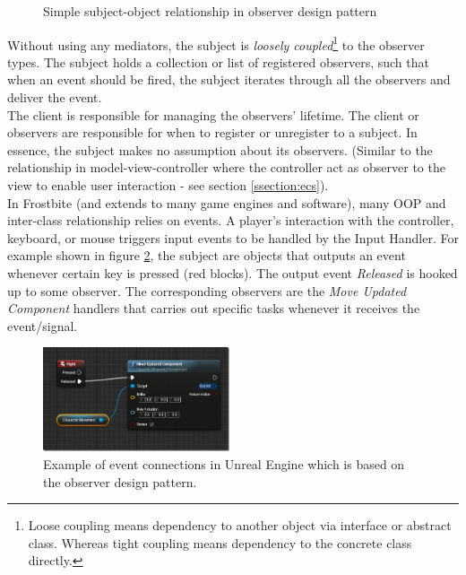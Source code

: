 \begin{multicols}{2}
\begin{figure}[H]
	\caption{Simple subject-object relationship in observer design pattern}
	\label{fig:observer-simple}
\end{figure}

Without using any mediators, the subject is \textit{loosely coupled}\footnote{Loose coupling means dependency to another object via interface or abstract class. Whereas tight coupling means dependency to the concrete class directly.} to the observer types. The subject holds a collection or list of registered observers, such that when an event should be fired, the subject iterates through all the observers and deliver the event.\bs
\\
The client is responsible for managing the observers' lifetime. The client or observers are responsible for when to register or unregister to a subject. In essence, the subject makes no assumption about its observers. (Similar to the relationship in model-view-controller where the controller act as observer to the view to enable user interaction - see section \ref{ssection:ecs}).\bs
\\
In Frostbite (and extends to many game engines and software), many OOP and inter-class relationship relies on events. A player's interaction with the controller, keyboard, or mouse triggers input events to be handled by the Input Handler. For example shown in figure \ref{fig:unreal-input}, the subject are objects that outputs an event whenever certain key is pressed (red blocks). The output event \textit{Released} is hooked up to some observer. The corresponding observers are the \textit{Move Updated Component} handlers that carries out specific tasks whenever it receives the event/signal.

\begin{figure}[H]
	\centering
	\includegraphics[width=0.49\textwidth]{assets/unreal-input}
	\caption{Example of event connections in Unreal Engine which is based on the observer design pattern. \cite{gfs-input}}
	\label{fig:unreal-input}
\end{figure}


\end{multicols}
